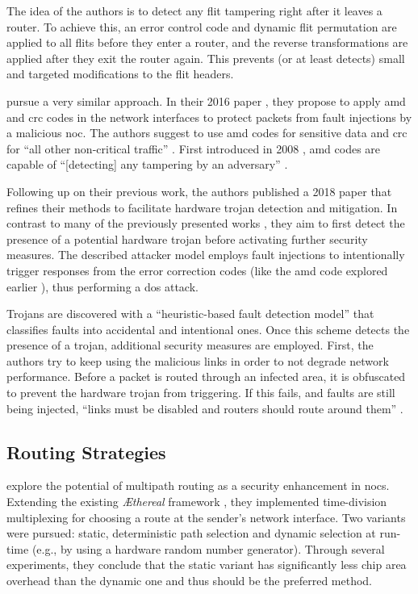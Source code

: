 The idea of the authors is to detect any flit tampering right after it leaves a router. To achieve this, an error control code and dynamic flit
permutation are applied to all flits before they enter a router, and the reverse transformations are applied after they exit the router again. This
prevents (or at least detects) small and targeted modifications to the flit headers.

\citeauthor{boraten16packetsecurity} pursue a very similar approach. In their 2016 paper \cite{boraten16packetsecurity}, they propose to apply
\gls{amd} and \gls{crc} codes in the network interfaces to protect packets from fault injections by a malicious \gls{noc}. The authors suggest to use
\gls{amd} codes for sensitive data and \gls{crc} for \enquote{all other non-critical traffic} \cite[2]{boraten16packetsecurity}. First introduced in 2008
\cite{cramer08amdcodes}, \gls{amd} codes are capable of \enquote{[detecting] any tampering by an adversary} \cite[1]{cramer08amdcodes}.

Following up on their previous work, the authors published a 2018 paper \cite{boraten18mitigationdos} that refines their methods to facilitate hardware
trojan detection and mitigation. In contrast to many of the previously presented works \cites(e.g.)(){ancajas14fortnocs}{frey17hardenednoc}, they aim
to first detect the presence of a potential hardware trojan before activating further security measures. The described attacker model employs fault injections to
intentionally trigger responses from the error correction codes (like the \gls{amd} code explored earlier \cite{boraten16packetsecurity}), thus
performing a \gls{dos} attack.

Trojans are discovered with a \enquote{heuristic-based fault detection model} \cite[25]{boraten18mitigationdos} that classifies faults into accidental
and intentional ones. Once this scheme detects the presence of a trojan, additional security measures are employed. First, the authors try to keep
using the malicious links in order to not degrade network performance. Before a packet is routed through an infected area, it is obfuscated to prevent
the hardware trojan from triggering. If this fails, and faults are still being injected, \enquote{links must be disabled and routers should route
around them} \cite[32]{boraten18mitigationdos}.

\subsection{Routing Strategies}
\citeauthor{stefan11enhancingnocs} \cite{stefan11enhancingnocs} explore the potential of multipath routing as a security enhancement in \glspl{noc}.
Extending the existing \textit{\AE thereal} framework \cite{goossens05aethereal}, they implemented time-division multiplexing for choosing a route at
the sender's network interface. Two variants were pursued: static, deterministic path selection and dynamic selection at run-time (e.g., by using a
hardware random number generator). Through several experiments, they conclude that the static variant has significantly less chip area overhead than
the dynamic one and thus should be the preferred method.

